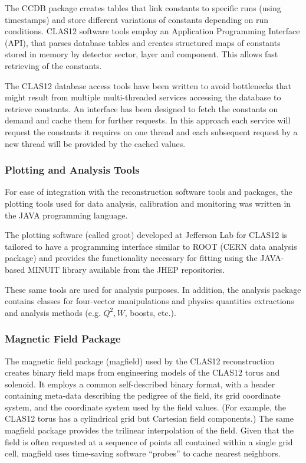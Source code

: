 \documentclass[3p,times,twocolumn]{elsarticle}
\begin{document}
The CCDB package creates
tables that link constants to specific runs (using timestamps) and store different variations of constants depending on run
conditions. CLAS12 software tools employ an Application Programming Interface (API), that parses database tables and creates
structured maps of constants stored in  memory by detector sector, layer and component. This allows fast retrieving of the
constants.

The CLAS12 database access tools have been written to avoid bottlenecks that might result from multiple multi-threaded
services accessing the database to retrieve constants.  An interface has been designed to fetch the constants
on demand and cache them for further requests. In this approach each service will request the
constants it requires on one thread and each subsequent request by a new thread will be provided by the cached values.

\subsubsection{Plotting and Analysis Tools}

For ease of integration with the reconstruction software tools and packages, the plotting tools used for data
analysis, calibration and monitoring was written in the JAVA programming language.

The plotting software (called groot) developed at Jefferson Lab for CLAS12 is tailored to have a programming
interface similar to ROOT
(CERN data analysis package) and provides the functionality necessary for
fitting using the JAVA-based MINUIT library available from the JHEP repositories.

These same tools are used for analysis purposes. In addition, the analysis package
contains classes for four-vector manipulations and physics quantities extractions and
analysis methods (e.g. $Q^2, W$, boosts, etc.).

\subsubsection{Magnetic Field Package}
The magnetic field package (magfield) used by the CLAS12 reconstruction creates
binary field maps from engineering models of the CLAS12 torus and solenoid. It employs
a common self-described binary format, with a header containing meta-data describing
the pedigree of the field, its grid coordinate system, and the coordinate system
used by the field values. (For example, the CLAS12 torus has a cylindrical grid
but Cartesian field components.) The same magfield package provides the trilinear
interpolation of the field. Given that the field is often requested at a sequence
of points all contained within a single grid cell, magfield uses time-saving
software “probes” to cache nearest neighbors.
\end{document}
